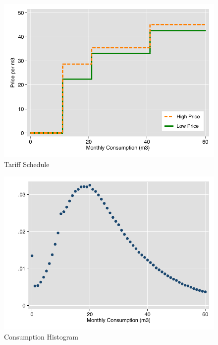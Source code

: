\documentclass[12pt,table]{article}
\begin{document}
\begin{figure}
\caption{Tariff Schedule}
\begin{center}
\includegraphics[scale=1]{tables/rs_prices.pdf}
\end{center}
\end{figure}

\begin{figure}
\begin{center}
\caption{Consumption Histogram}
\includegraphics[scale=1]{tables/consumption_histogram.pdf}
\end{center}
\end{figure}
\end{document}
